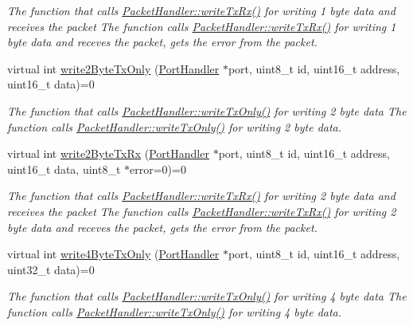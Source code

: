 \begin{DoxyCompactItemize}
\begin{DoxyCompactList}\small\item\em The function that calls \hyperlink{classmercury_1_1_packet_handler_adf35a5000d465bd5426530e34a91a21d}{Packet\+Handler\+::write\+Tx\+Rx()} for writing 1 byte data and receives the packet  The function calls \hyperlink{classmercury_1_1_packet_handler_adf35a5000d465bd5426530e34a91a21d}{Packet\+Handler\+::write\+Tx\+Rx()} for writing 1 byte data and receves the packet,  gets the error from the packet. \end{DoxyCompactList}\item 
virtual int \hyperlink{classmercury_1_1_packet_handler_a417e5e07c5592d3dc524da4b4c829fb4}{write2\+Byte\+Tx\+Only} (\hyperlink{classmercury_1_1_port_handler}{Port\+Handler} $\ast$port, uint8\+\_\+t id, uint16\+\_\+t address, uint16\+\_\+t data)=0
\begin{DoxyCompactList}\small\item\em The function that calls \hyperlink{classmercury_1_1_packet_handler_acf4e01987186250221603f794e7e4b59}{Packet\+Handler\+::write\+Tx\+Only()} for writing 2 byte data  The function calls \hyperlink{classmercury_1_1_packet_handler_acf4e01987186250221603f794e7e4b59}{Packet\+Handler\+::write\+Tx\+Only()} for writing 2 byte data. \end{DoxyCompactList}\item 
virtual int \hyperlink{classmercury_1_1_packet_handler_a5beac405c8ea75cc82ea5c01867a45db}{write2\+Byte\+Tx\+Rx} (\hyperlink{classmercury_1_1_port_handler}{Port\+Handler} $\ast$port, uint8\+\_\+t id, uint16\+\_\+t address, uint16\+\_\+t data, uint8\+\_\+t $\ast$error=0)=0
\begin{DoxyCompactList}\small\item\em The function that calls \hyperlink{classmercury_1_1_packet_handler_adf35a5000d465bd5426530e34a91a21d}{Packet\+Handler\+::write\+Tx\+Rx()} for writing 2 byte data and receives the packet  The function calls \hyperlink{classmercury_1_1_packet_handler_adf35a5000d465bd5426530e34a91a21d}{Packet\+Handler\+::write\+Tx\+Rx()} for writing 2 byte data and receves the packet,  gets the error from the packet. \end{DoxyCompactList}\item 
virtual int \hyperlink{classmercury_1_1_packet_handler_adf97e077894f1e01f53b7468e4470c19}{write4\+Byte\+Tx\+Only} (\hyperlink{classmercury_1_1_port_handler}{Port\+Handler} $\ast$port, uint8\+\_\+t id, uint16\+\_\+t address, uint32\+\_\+t data)=0
\begin{DoxyCompactList}\small\item\em The function that calls \hyperlink{classmercury_1_1_packet_handler_acf4e01987186250221603f794e7e4b59}{Packet\+Handler\+::write\+Tx\+Only()} for writing 4 byte data  The function calls \hyperlink{classmercury_1_1_packet_handler_acf4e01987186250221603f794e7e4b59}{Packet\+Handler\+::write\+Tx\+Only()} for writing 4 byte data. \end{DoxyCompactList}\item 

\end{DoxyCompactItemize}
